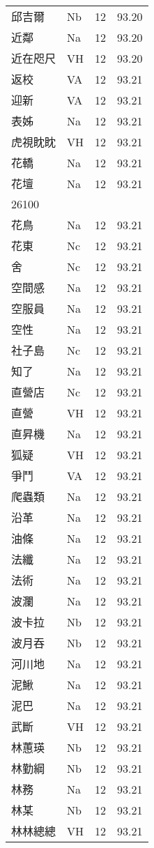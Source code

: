 \documentclass[twocolumn]{book}
\begin{document}
\begin{supertabular}{llrr}
邱吉爾 & Nb & 12 &  93.20\\
近鄰 & Na & 12 &  93.20\\
近在咫尺 & VH & 12 &  93.20\\
返校 & VA & 12 &  93.21\\
迎新 & VA & 12 &  93.21\\
表姊 & Na & 12 &  93.21\\
虎視眈眈 & VH & 12 &  93.21\\
花轎 & Na & 12 &  93.21\\
花壇 & Na & 12 &  93.21\\
26100\\
花鳥 & Na & 12 &  93.21\\
花東 & Nc & 12 &  93.21\\
舍 & Nc & 12 &  93.21\\
空間感 & Na & 12 &  93.21\\
空服員 & Na & 12 &  93.21\\
空性 & Na & 12 &  93.21\\
社子島 & Nc & 12 &  93.21\\
知了 & Na & 12 &  93.21\\
直營店 & Nc & 12 &  93.21\\
直營 & VH & 12 &  93.21\\
直昇機 & Na & 12 &  93.21\\
狐疑 & VH & 12 &  93.21\\
爭鬥 & VA & 12 &  93.21\\
爬蟲類 & Na & 12 &  93.21\\
沿革 & Na & 12 &  93.21\\
油條 & Na & 12 &  93.21\\
法纖 & Na & 12 &  93.21\\
法術 & Na & 12 &  93.21\\
波瀾 & Na & 12 &  93.21\\
波卡拉 & Nb & 12 &  93.21\\
波月吞 & Nb & 12 &  93.21\\
河川地 & Na & 12 &  93.21\\
泥鰍 & Na & 12 &  93.21\\
泥巴 & Na & 12 &  93.21\\
武斷 & VH & 12 &  93.21\\
林蕙瑛 & Nb & 12 &  93.21\\
林勤綱 & Nb & 12 &  93.21\\
林務 & Na & 12 &  93.21\\
林某 & Nb & 12 &  93.21\\
林林總總 & VH & 12 &  93.21\\

\end{supertabular}
\end{document}
